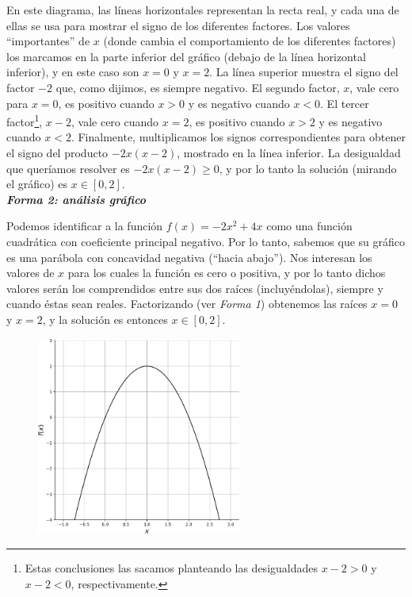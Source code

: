 \documentclass[12pt]{article}
\theoremstyle{definition}
\begin{document}
\begin{enumerate}
\begin{enumerate}
En este diagrama, las líneas horizontales representan la recta real, y cada una de ellas se usa para mostrar el signo de los diferentes factores. Los valores ``importantes'' de $x$ (donde cambia el comportamiento de los diferentes factores) los marcamos en la parte inferior del gráfico (debajo de la línea horizontal inferior), y en este caso son $x = 0$ y $x = 2$. La línea superior muestra el signo del factor $-2$ que, como dijimos, es siempre negativo. El segundo factor, $x$, vale cero para $x = 0$, es positivo cuando $x > 0$ y es negativo cuando $x < 0$. El tercer factor\footnote{Estas conclusiones las sacamos planteando las desigualdades $x - 2 > 0$ y $x - 2 < 0$, respectivamente.}, $x - 2$, vale cero cuando $x = 2$, es positivo cuando $x > 2$ y es negativo cuando $x < 2$. Finalmente, multiplicamos los signos correspondientes para obtener el signo del producto $-2x(x - 2)$, mostrado en la línea inferior. La desigualdad que queríamos resolver es $-2x(x - 2) \geq 0$, y por lo tanto la solución (mirando el gráfico) es $x \in [0,2]$.\\
	
\textbf{\textit{Forma 2: análisis gráfico}}
	
Podemos identificar a la función $f(x) = -2x^2 + 4x$ como una función cuadrática con coeficiente principal negativo. Por lo tanto, sabemos que su gráfico es una parábola con concavidad negativa (``hacia abajo''). Nos interesan los valores de $x$ para los cuales la función es cero o positiva, y por lo tanto dichos valores serán los comprendidos entre sus dos raíces (incluyéndolas), siempre y cuando éstas sean reales. Factorizando (ver \textit{Forma 1}) obtenemos las raíces $x = 0$ y $x = 2$, y la solución es entonces $x \in [0,2]$.
	
\begin{figure}[H]
	\centering
	\includegraphics[width=0.6\textwidth]{16_b2.png}
\end{figure}


\end{enumerate}
\end{enumerate}
\end{document}
